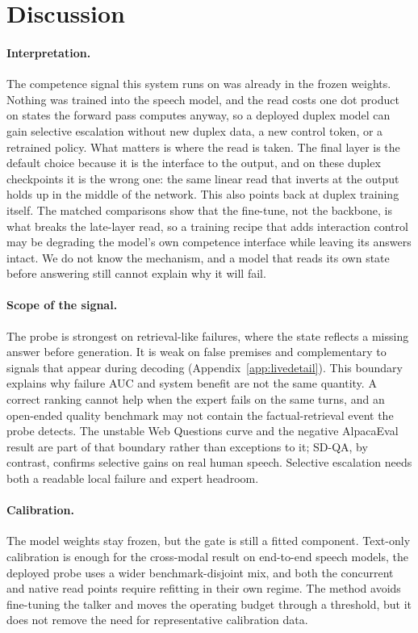\section{Discussion}
\label{sec:discussion}

\paragraph{Interpretation.}
The competence signal this system runs on was already in the frozen
weights. Nothing was trained into the speech model, and the read costs
one dot product on states the forward pass computes anyway, so a
deployed duplex model can gain selective escalation without new
duplex data, a new control token, or a retrained policy. What matters
is where the read is taken. The final layer is the default choice
because it is the interface to the output, and on these duplex
checkpoints it is the wrong one: the same linear read that inverts at
the output holds up in the middle of the network. This also points
back at duplex training itself. The matched comparisons show that the
fine-tune, not the backbone, is what breaks the late-layer read, so a
training recipe that adds interaction control may be degrading the
model's own competence interface while leaving its answers intact. We
do not know the mechanism, and a model that reads its own state
before answering still cannot explain why it will fail.

\paragraph{Scope of the signal.}
The probe is strongest on retrieval-like failures, where the state
reflects a missing answer before generation. It is weak on false
premises and complementary to signals that appear during decoding
(Appendix~\ref{app:livedetail}). This boundary explains why failure
AUC and system benefit are not the same quantity. A correct ranking
cannot help when the expert fails on the same turns, and an
open-ended quality benchmark may not contain the factual-retrieval
event the probe detects. The unstable Web Questions curve and the
negative AlpacaEval result are part of that boundary rather than
exceptions to it; SD-QA, by contrast, confirms selective gains on
real human speech. Selective escalation needs both a readable local
failure and expert headroom.

\paragraph{Calibration.}
The model weights stay frozen, but the gate is still a fitted
component. Text-only calibration is enough for the cross-modal result
on end-to-end speech models, the deployed probe uses a wider
benchmark-disjoint mix, and both the concurrent and native read
points require refitting in their own regime. The method avoids
fine-tuning the talker and moves the operating budget through a
threshold, but it does not remove the need for representative
calibration data.

